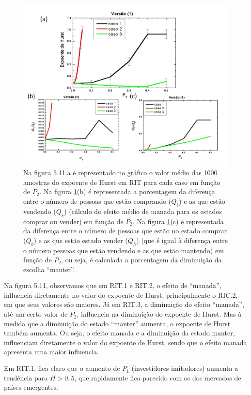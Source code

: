\documentclass[brazil,ruledheader]{abnt}
\begin{document}
\begin{figure}[!h]
\centering
\includegraphics[width=0.8\linewidth]{Figuras/11.jpg}
\caption[Análise do expoente de Hurst em RIT]{Na figura 5.11.a é representado no
gráfico o valor médio das 1000 amostras do expoente de Hurst em RIT para cada
caso em função de $P_2$.
Na figura \ref{fig:valor-medio}(b) é representada a porcentagem da diferença
entre o número de pessoas que estão comprando ($Q_b$) e as que estão vendendo
($Q_s$) (cálculo do efeito médio de manada para os estados comprar ou vender)
em função de $P_2$. Na figura \ref{fig:valor-medio}(c) é representada da
diferença entre o número de pessoas que estão no estado comprar ($Q_b$) e as que
estão estado vender ($Q_h$) (que é igual à diferença entre o número pessoas que
estão
vendendo e as que estão mantendo) em função de $P_2$, ou seja, é calculada a
porcentagem da diminuição da escolha ``manter''.}
\label{fig:valor-medio}
\end{figure}


Na figura 5.11, observamos que em RIT.1 e RIT.2, o efeito de ``manada'',
influencia diretamente no valor do expoente de Hurst, principalmente o RIC.2, em
que seus valores são maiores.  Já em RIT.3, a diminuição do efeito “manada”, até
um certo valor de $P_2$, influencia na diminuição do expoente de Hurst. Mas à
medida que a diminuição do  estado “manter” aumenta, o expoente de Hurst também
aumenta. Ou seja, o efeito manada e a diminuição da estado manter, influenciam
diretamente o valor do expoente de Hurst, sendo que o efeito manada apresenta
uma maior influencia. 
   
Em RIT.1, fica claro que o aumento de $P_1$ (investidores imitadores)
aumenta a tendência para $H>0,5$, que rapidamente fica parecido com os dos
mercados de países emergentes. 
\end{document}
